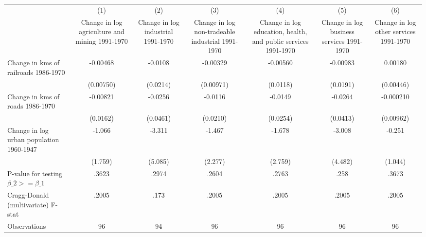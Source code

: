{
\def\sym#1{\ifmmode^{#1}\else\(^{#1}\)\fi}
\begin{tabular}{l*{6}{c}}
\hline\hline
                &\multicolumn{1}{c}{(1)}&\multicolumn{1}{c}{(2)}&\multicolumn{1}{c}{(3)}&\multicolumn{1}{c}{(4)}&\multicolumn{1}{c}{(5)}&\multicolumn{1}{c}{(6)}\\
                &\multicolumn{1}{c}{Change in log agriculture and mining 1991-1970}&\multicolumn{1}{c}{Change in log industrial 1991-1970}&\multicolumn{1}{c}{Change in log non-tradeable industrial 1991-1970}&\multicolumn{1}{c}{Change in log education, health, and public services 1991-1970}&\multicolumn{1}{c}{Change in log business services 1991-1970}&\multicolumn{1}{c}{Change in log other services 1991-1970}\\
\hline
Change in kms of railroads 1986-1970& -0.00468         &  -0.0108         & -0.00329         & -0.00560         & -0.00983         &  0.00180         \\
                &(0.00750)         & (0.0214)         &(0.00971)         & (0.0118)         & (0.0191)         &(0.00446)         \\
[1em]
Change in kms of roads 1986-1970& -0.00821         &  -0.0256         &  -0.0116         &  -0.0149         &  -0.0264         &-0.000210         \\
                & (0.0162)         & (0.0461)         & (0.0210)         & (0.0254)         & (0.0413)         &(0.00962)         \\
[1em]
Change in log urban population 1960-1947&   -1.066         &   -3.311         &   -1.467         &   -1.678         &   -3.008         &   -0.251         \\
                &  (1.759)         &  (5.085)         &  (2.277)         &  (2.759)         &  (4.482)         &  (1.044)         \\
\hline
P-value for testing $\beta\_{2} >= \beta\_{1}$&    .3623         &    .2974         &    .2604         &    .2763         &     .258         &    .3673         \\
Cragg-Donald (multivariate) F-stat&    .2005         &     .173         &    .2005         &    .2005         &    .2005         &    .2005         \\
Observations    &       96         &       94         &       96         &       96         &       96         &       96         \\
\hline\hline
\end{tabular}
}
